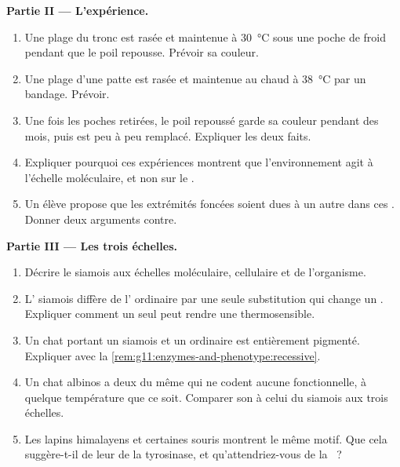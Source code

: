 \begin{problem}
\medskip
\noindent\textbf{Partie II --- L'expérience.}
\begin{enumerate}[resume]
  \item Une plage du tronc est rasée et maintenue à \qty{30}{\celsius}
        sous une poche de froid pendant que le poil repousse. Prévoir
        sa couleur.
  \item Une plage d'une patte est rasée et maintenue au chaud à
        \qty{38}{\celsius} par un bandage. Prévoir.
  \item Une fois les poches retirées, le poil repoussé garde sa couleur
        pendant des mois, puis est peu à peu remplacé. Expliquer les
        deux faits.
  \item Expliquer pourquoi ces expériences montrent que l'environnement
        agit à l'échelle moléculaire, et non sur le .
  \item Un élève propose que les extrémités foncées soient dues à un
        autre  dans ces . Donner deux arguments contre.
\end{enumerate}

\medskip
\noindent\textbf{Partie III --- Les trois échelles.}
\begin{enumerate}[resume]
  \item Décrire le  siamois aux échelles moléculaire,
        cellulaire et de l'organisme.
  \item L' siamois diffère de l' ordinaire par une seule
        substitution qui change un . Expliquer comment un
        seul  peut rendre une  thermosensible.
  \item Un chat portant un  siamois et un  ordinaire est
        entièrement pigmenté. Expliquer avec la
        \cref{rem:g11:enzymes-and-phenotype:recessive}.
  \item Un chat albinos a deux  du même  qui ne codent
        aucune  fonctionnelle, à quelque température que ce soit.
        Comparer son  à celui du siamois aux trois échelles.
  \item Les lapins himalayens et certaines souris montrent le même
        motif. Que cela suggère-t-il de leur  de la tyrosinase, et
        qu'attendriez-vous de la ~?
\end{enumerate}


\end{problem}

